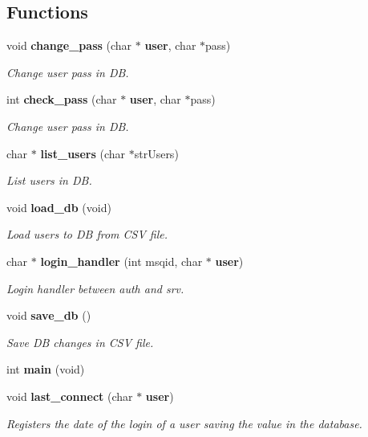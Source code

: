 \subsection*{Functions}
\begin{DoxyCompactItemize}
\item 
void \textbf{ change\+\_\+pass} (char $\ast$\textbf{ user}, char $\ast$pass)
\begin{DoxyCompactList}\small\item\em Change user pass in DB. \end{DoxyCompactList}\item 
int \textbf{ check\+\_\+pass} (char $\ast$\textbf{ user}, char $\ast$pass)
\begin{DoxyCompactList}\small\item\em Change user pass in DB. \end{DoxyCompactList}\item 
char $\ast$ \textbf{ list\+\_\+users} (char $\ast$str\+Users)
\begin{DoxyCompactList}\small\item\em List users in DB. \end{DoxyCompactList}\item 
void \textbf{ load\+\_\+db} (void)
\begin{DoxyCompactList}\small\item\em Load users to DB from C\+SV file. \end{DoxyCompactList}\item 
char $\ast$ \textbf{ login\+\_\+handler} (int msqid, char $\ast$\textbf{ user})
\begin{DoxyCompactList}\small\item\em Login handler between auth and srv. \end{DoxyCompactList}\item 
void \textbf{ save\+\_\+db} ()
\begin{DoxyCompactList}\small\item\em Save DB changes in C\+SV file. \end{DoxyCompactList}\item 
int \textbf{ main} (void)
\item 
void \textbf{ last\+\_\+connect} (char $\ast$\textbf{ user})
\begin{DoxyCompactList}\small\item\em Registers the date of the login of a user saving the value in the database. \end{DoxyCompactList}\item 

\end{DoxyCompactItemize}
